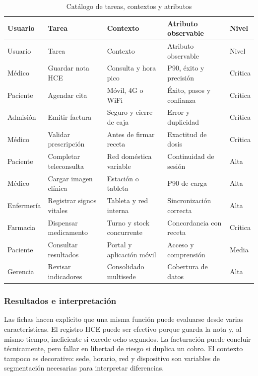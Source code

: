 \begin{longtable}{p{2.0cm}p{3.1cm}p{3.5cm}p{2.9cm}p{1.4cm}}
\caption{Catálogo de tareas, contextos y atributos}\label{tab:utc}\\
\toprule
Usuario & Tarea & Contexto & Atributo observable & Nivel \\
\midrule
\endfirsthead
\toprule
Usuario & Tarea & Contexto & Atributo observable & Nivel \\
\midrule
\endhead
Médico & Guardar nota HCE & Consulta y hora pico & P90, éxito y precisión & Crítica \\
Paciente & Agendar cita & Móvil, 4G o WiFi & Éxito, pasos y confianza & Crítica \\
Admisión & Emitir factura & Seguro y cierre de caja & Error y duplicidad & Crítica \\
Médico & Validar prescripción & Antes de firmar receta & Exactitud de dosis & Crítica \\
Paciente & Completar teleconsulta & Red doméstica variable & Continuidad de sesión & Alta \\
Médico & Cargar imagen clínica & Estación o tableta & P90 de carga & Alta \\
Enfermería & Registrar signos vitales & Tableta y red interna & Sincronización correcta & Alta \\
Farmacia & Dispensar medicamento & Turno y stock concurrente & Concordancia con receta & Crítica \\
Paciente & Consultar resultados & Portal y aplicación móvil & Acceso y comprensión & Media \\
Gerencia & Revisar indicadores & Consolidado multisede & Cobertura de datos & Alta \\
\bottomrule
\end{longtable}

\subsubsection{Resultados e interpretación}

Las fichas hacen explícito que una misma función puede evaluarse desde varias características. El registro HCE puede ser efectivo porque guarda la nota y, al mismo tiempo, ineficiente si excede ocho segundos. La facturación puede concluir técnicamente, pero fallar en libertad de riesgo si duplica un cobro. El contexto tampoco es decorativo: sede, horario, red y dispositivo son variables de segmentación necesarias para interpretar diferencias.

